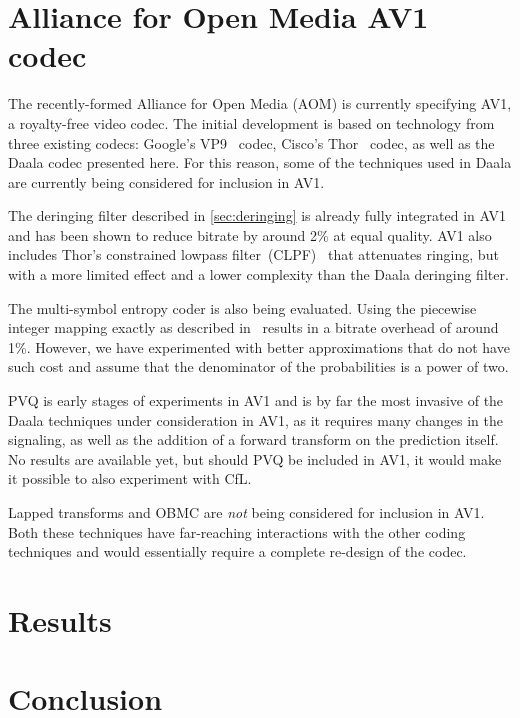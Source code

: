 \documentclass[english,conference,10pt]{IEEEtran}
\begin{document}
\section{Alliance for Open Media AV1 codec}
\label{sec:AOM}

The recently-formed Alliance for Open Media (AOM) is currently specifying
AV1, a royalty-free video codec. The initial development is based on
technology from three existing codecs: Google's VP9~\cite{VP9Spec} codec,
Cisco's Thor~\cite{ThorDraft} codec, as well as the Daala codec presented
here. For this reason, some of the techniques used in Daala are currently
being considered for inclusion in AV1.

The deringing filter described in \cref{sec:deringing} is already
fully integrated in AV1 and has been shown to reduce bitrate by around 2\%
at equal quality. AV1 also includes Thor's constrained lowpass
filter~(CLPF)~\cite{CLPFDraft} that attenuates ringing, but with a more
limited effect and a lower complexity than the Daala deringing filter.

The multi-symbol entropy coder is also being evaluated. Using the piecewise
integer mapping exactly as described in~\cite{stuiver1998piecewise} results
in a bitrate overhead of around 1\%. However, we have experimented with
better approximations that do not have such cost and assume that
the denominator of the probabilities is a power of two.

PVQ is early stages of experiments in AV1 and is by far the most invasive
of the Daala techniques under consideration in AV1, as it requires many changes
in the signaling, as well as the addition of a forward transform on the
prediction itself. No results are available yet, but should PVQ be
included in AV1, it would make it possible to also experiment with CfL.

Lapped transforms and OBMC are \textit{not} being considered for inclusion
in AV1. Both these techniques have far-reaching interactions with the
other coding techniques and would essentially require a complete re-design
of the codec.

\section{Results}
\label{sec:Results}


\section{Conclusion}



\end{document}
